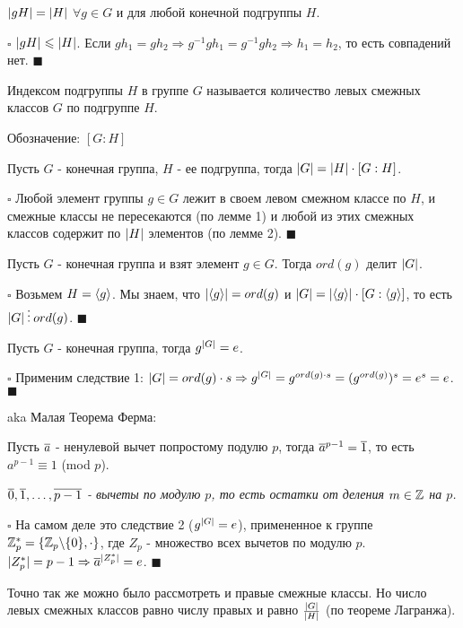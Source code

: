 \documentclass[../main.tex]{subfiles}
\begin{document}
\void
{} $\vert gH\vert = \vert H\vert$ $\forall g\in G$ и для любой конечной подгруппы $H$.

\void
$\square$ $\vert gH\vert\leqslant \vert H\vert$. Если $gh_1 = gh_2 \Rightarrow g^{-1}gh_1 = g^{-1}gh_2
\Rightarrow h_1 = h_2$, то есть совпадений нет. $\blacksquare$

\void
{} Индексом подгруппы $H$ в группе $G$ называется количество левых смежных классов $G$ по подгруппе $H$.

Обозначение: $[G:H]$

\void
{}

Пусть $G$ - конечная группа, $H$ - ее подгруппа, тогда $\vert G\vert = \vert H\vert\cdot [G:H]$.

\void
$\square$ Любой элемент группы $g\in G$ лежит в своем левом смежном классе по $H$, и смежные классы не пересекаются
(по лемме 1) и любой из этих смежных классов содержит по $\vert H\vert$ элементов (по лемме 2).
$\blacksquare$

\void
{} Пусть $G$ - конечная группа и взят элемент $g\in G$. Тогда $ord(g)$ делит $\vert G\vert$.

\void
$\square$ Возьмем $H = \langle g\rangle$. Мы знаем, что $\vert \langle g\rangle\vert = ord(g)$ и
$\vert G\vert = \vert \langle g\rangle\vert\cdot [G:\langle g\rangle]$, то есть $\vert G\vert\:\vdots\: ord(g)$.
$\blacksquare$

\void
{} Пусть $G$ - конечная группа, тогда $g^{\vert G\vert} = e$.

\void
$\square$ Применим следствие 1: $\vert G\vert = ord(g)\cdot s \Rightarrow g^{\vert G\vert} = g^{ord(g)\cdot s} =
(g^{ord(g)})^s = e^s = e$.
$\blacksquare$

\void
{} aka Малая Теорема Ферма:

Пусть $\overline{a}$ - ненулевой вычет попростому подулю $p$, тогда $\overline{a}^{p-1} = \overline{1}$,
то есть $a^{p-1}\equiv 1$ (mod $p$).

\void
\textit{$\overline{0}, \overline{1},\dots,\overline{p-1}$ - вычеты по модулю $p$, то есть остатки от деления
$m\in\mathbb{Z}$ на $p$.}

\void
$\square$ На самом деле это следствие 2 ($g^{\vert G\vert} = e$), примененное к группе 
$\mathbb{Z}_p^* = \{ \mathbb{Z}_p\backslash \{0\}, \cdot \}$, где $Z_p$ - множество всех вычетов по модулю $p$.
$\vert Z_p^*\vert = p - 1 \Rightarrow \overline{a}^{\vert Z_p^*\vert} = e$.
$\blacksquare$

\void
{} Точно так же можно было рассмотреть и правые смежные классы. Но число левых смежных классов
равно числу правых и равно $\frac{\vert G\vert}{\vert H\vert}$ (по теореме Лагранжа).
\end{document}
